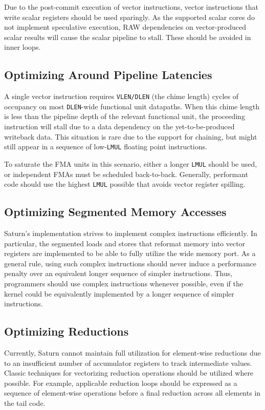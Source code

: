 Due to the post-commit execution of vector instructions, vector instructions that write scalar registers should be used sparingly.
As the supported scalar cores do not implement speculative execution, RAW dependencies on vector-produced scalar results will cause the scalar pipeline to stall.
These should be avoided in inner loops.


\subsection{Optimizing Around Pipeline Latencies}

A single vector instruction requires \texttt{VLEN/DLEN} (the chime length) cycles of occupancy on most \texttt{DLEN}-wide functional unit datapaths.
When this chime length is less than the pipeline depth of the relevant functional unit, the proceeding instruction will stall due to a data dependency on the yet-to-be-produced writeback data.
This situation is rare due to the support for chaining, but might still appear in a sequence of low-\texttt{LMUL} floating point instructions.

To saturate the FMA units in this scenario, either a longer \texttt{LMUL} should be used, or independent FMAs must be scheduled back-to-back.
Generally, performant code should use the highest \texttt{LMUL} possible that avoids vector register spilling.


\subsection{Optimizing Segmented Memory Accesses}

Saturn's implementation strives to implement complex instructions efficiently.
In particular, the segmented loads and stores that reformat memory into vector registers are implemented to be able to fully utilize the wide memory port.
As a general rule, using such complex instructions should never induce a performance penalty over an equivalent longer sequence of simpler instructions.
Thus, programmers should use complex instructions whenever possible, even if the kernel could be equivalently implemented by a longer sequence of simpler instructions.


\subsection{Optimizing Reductions}

Currently, Saturn cannot maintain full utilization for element-wise reductions due to an insufficient number of accumulator registers to track intermediate values.
Classic techniques for vectorizing reduction operations should be utilized where possible. 
For example, applicable reduction loops should be expressed as a sequence of element-wise operations before a final reduction across all elements in the tail code.



